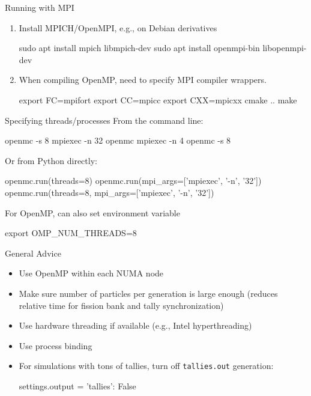 \documentclass[noamssymb,svgnames]{beamer}
\newcommand{\obj}[1]{\texttt{\color{darkblue}#1}}
\begin{document}
\begin{frame}[fragile]{Running with MPI}
  \begin{enumerate}
  \item Install MPICH/OpenMPI, e.g., on Debian derivatives
  \begin{shell}
    sudo apt install mpich libmpich-dev
    sudo apt install openmpi-bin libopenmpi-dev
  \end{shell}
  \item When compiling OpenMP, need to specify MPI compiler wrappers.
    \begin{shell}
      export FC=mpifort
      export CC=mpicc
      export CXX=mpicxx
      cmake ..
      make
    \end{shell}
  \end{enumerate}
\end{frame}

\begin{frame}[fragile]{Specifying threads/processes}
  From the command line:
  \begin{shell}
    openmc -s 8
    mpiexec -n 32 openmc
    mpiexec -n 4 openmc -s 8
  \end{shell}
  \vfill
  Or from Python directly:
  \begin{python}[minted options={fontsize=\scriptsize}]
    openmc.run(threads=8)
    openmc.run(mpi_args=['mpiexec', '-n', '32'])
    openmc.run(threads=8, mpi_args=['mpiexec', '-n', '32'])
  \end{python}
  \vfill
  For OpenMP, can also set environment variable
  \begin{shell}
    export OMP_NUM_THREADS=8
  \end{shell}
\end{frame}

\begin{frame}[fragile]{General Advice}
  \begin{itemize}
  \item Use OpenMP within each NUMA node
  \item Make sure number of particles per generation is large enough (reduces
    relative time for fission bank and tally synchronization)
  \item Use hardware threading if available (e.g., Intel hyperthreading)
  \item Use process binding
  \item For simulations with tons of tallies, turn off \obj{tallies.out}
    generation:
    \begin{python}
      settings.output = {'tallies': False}
    \end{python}
  \end{itemize}
\end{frame}
\end{document}
